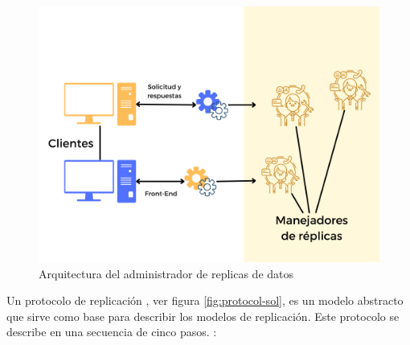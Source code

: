   \begin{figure}%
 	\includegraphics {9/4.png } 
 	\caption{Arquitectura del administrador de replicas de datos}
 	\label{fig:adm-rep}
 \end{figure}
 
  
 
 Un protocolo de replicaci\'on  , ver figura  \ref{fig:protocol-sol}, es un modelo abstracto que sirve como base para describir los modelos de replicaci\'on. Este protocolo  se describe en una secuencia de cinco pasos. :

 
